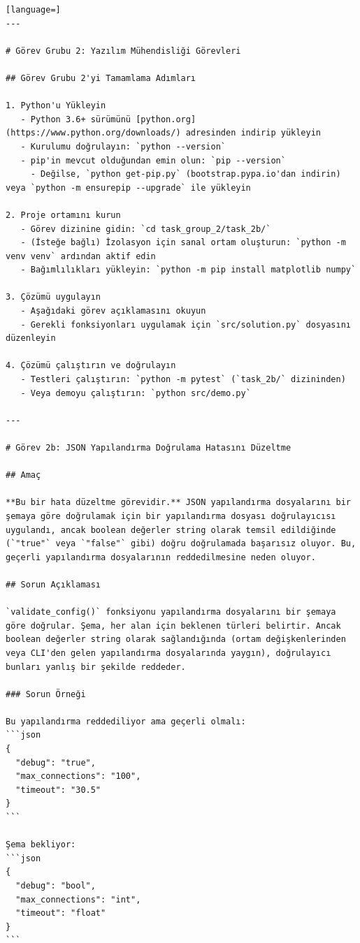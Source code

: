 \begin{appendices}
\begin{lstlisting}[language=]
---

# Görev Grubu 2: Yazılım Mühendisliği Görevleri

## Görev Grubu 2'yi Tamamlama Adımları

1. Python'u Yükleyin
   - Python 3.6+ sürümünü [python.org](https://www.python.org/downloads/) adresinden indirip yükleyin
   - Kurulumu doğrulayın: `python --version`
   - pip'in mevcut olduğundan emin olun: `pip --version`
     - Değilse, `python get-pip.py` (bootstrap.pypa.io'dan indirin) veya `python -m ensurepip --upgrade` ile yükleyin

2. Proje ortamını kurun
   - Görev dizinine gidin: `cd task_group_2/task_2b/`
   - (İsteğe bağlı) İzolasyon için sanal ortam oluşturun: `python -m venv venv` ardından aktif edin
   - Bağımlılıkları yükleyin: `python -m pip install matplotlib numpy`

3. Çözümü uygulayın
   - Aşağıdaki görev açıklamasını okuyun
   - Gerekli fonksiyonları uygulamak için `src/solution.py` dosyasını düzenleyin

4. Çözümü çalıştırın ve doğrulayın
   - Testleri çalıştırın: `python -m pytest` (`task_2b/` dizininden)
   - Veya demoyu çalıştırın: `python src/demo.py`

---

# Görev 2b: JSON Yapılandırma Doğrulama Hatasını Düzeltme

## Amaç

**Bu bir hata düzeltme görevidir.** JSON yapılandırma dosyalarını bir şemaya göre doğrulamak için bir yapılandırma dosyası doğrulayıcısı uygulandı, ancak boolean değerler string olarak temsil edildiğinde (`"true"` veya `"false"` gibi) doğru doğrulamada başarısız oluyor. Bu, geçerli yapılandırma dosyalarının reddedilmesine neden oluyor.

## Sorun Açıklaması

`validate_config()` fonksiyonu yapılandırma dosyalarını bir şemaya göre doğrular. Şema, her alan için beklenen türleri belirtir. Ancak boolean değerler string olarak sağlandığında (ortam değişkenlerinden veya CLI'den gelen yapılandırma dosyalarında yaygın), doğrulayıcı bunları yanlış bir şekilde reddeder.

### Sorun Örneği

Bu yapılandırma reddediliyor ama geçerli olmalı:
```json
{
  "debug": "true",
  "max_connections": "100",
  "timeout": "30.5"
}
```

Şema bekliyor:
```json
{
  "debug": "bool",
  "max_connections": "int",
  "timeout": "float"
}
```


\end{lstlisting}
\end{appendices}
